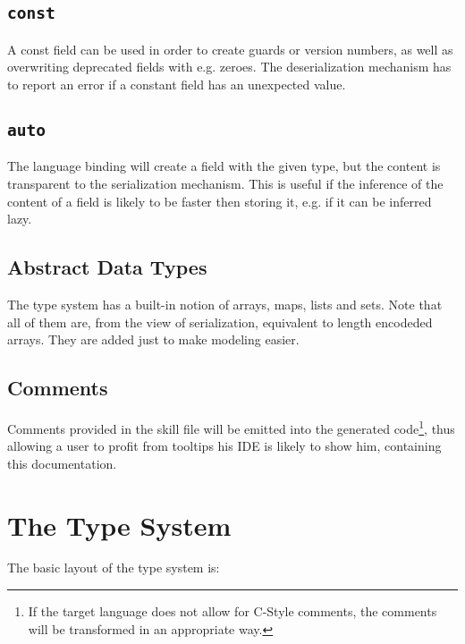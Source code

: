 \documentclass[a4paper,10pt]{article}
\begin{document}
\subsection{\texttt{const}}
A const field can be used in order to create guards or version numbers, as well as overwriting deprecated fields with e.g. zeroes. The deserialization mechanism has to report an error if a constant field has an unexpected value.

\subsection{\texttt{auto}}
The language binding will create a field with the given type, but the content is transparent to the serialization mechanism. This is useful if the inference of the content of a field is likely to be faster then storing it, e.g. if it can be inferred lazy.

\subsection{Abstract Data Types}
The type system has a built-in notion of arrays, maps, lists and sets. Note that all of them are, from the view of serialization, equivalent to length encodeded arrays. They are added just to make modeling easier. 

\subsection{Comments}
Comments provided in the skill file will be emitted into the generated code\footnote{If the target language does not allow for C-Style comments, the comments will be transformed in an appropriate way.}, thus allowing a user to profit from tooltips his IDE is likely to show him, containing this documentation. 

\section{The Type System}

The basic layout of the type system is:

\end{document}
